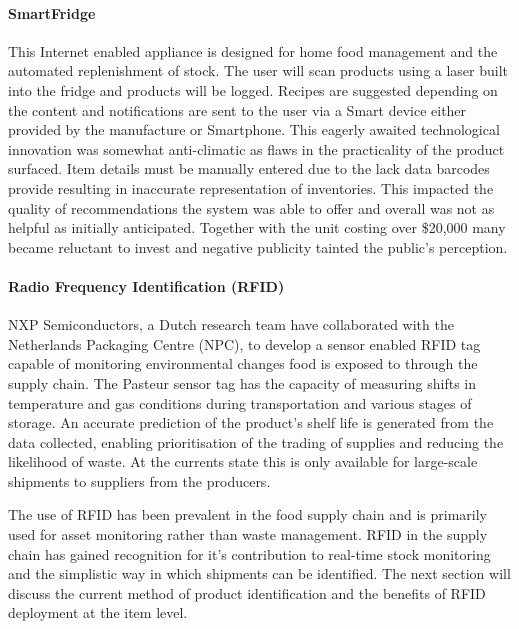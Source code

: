 \documentclass[a4paper, 11pt]{article}
\begin{document}
\paragraph{SmartFridge}
This Internet enabled appliance is designed for home food management and the automated replenishment of stock. The user will scan products using a laser built into the fridge and products will be logged. Recipes are suggested depending on the content and notifications are sent to the user via a Smart device either provided by the manufacture or Smartphone. This eagerly awaited technological innovation was somewhat anti-climatic as flaws in the practicality of the product surfaced. Item details must be manually entered due to the lack data barcodes provide resulting in inaccurate representation of inventories. This impacted the quality of recommendations the system was able to offer and overall was not as helpful as initially anticipated. Together with the unit costing over \$20,000 many became reluctant to invest and negative publicity tainted the public's perception.\cite{idiotFridge}

\paragraph{Radio Frequency Identification (RFID)}NXP Semiconductors, a Dutch research team have collaborated with the Netherlands Packaging Centre (NPC),  to develop a sensor enabled RFID tag capable of monitoring environmental changes food is exposed to through the supply chain.\cite{rfidFood} The Pasteur sensor tag has the capacity of measuring shifts in temperature and gas conditions during transportation and various stages of storage. An accurate prediction of the product's shelf life is generated from the data collected, enabling prioritisation of the trading of supplies and reducing the likelihood of waste. At the currents state this is only available for large-scale shipments to suppliers from the producers.

The use of RFID has been prevalent in the food supply chain and is primarily used for asset monitoring rather than waste management. RFID in the supply chain has gained recognition for it's contribution to real-time stock monitoring and the simplistic way in which shipments can be identified.\cite{RFID} The next section will discuss the current method of product identification and the benefits of RFID deployment at the item level.


\vspace{\baselineskip}
\vspace{\baselineskip}
\vspace{\baselineskip}
\end{document}
